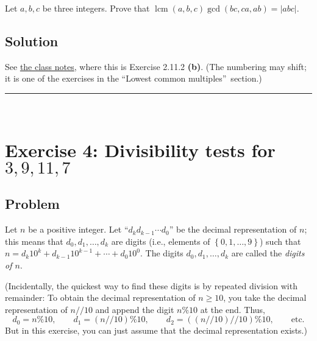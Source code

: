 \documentclass[paper=a4, fontsize=12pt]{scrartcl}%
\theoremstyle{plainsl}
\theoremstyle{definition}
\theoremstyle{remark}
\begin{document}
Let $a, b, c$ be three integers. Prove that $\operatorname{lcm}\left(  a, b, c
\right)  \gcd\left(  bc, ca, ab \right)  = \left|  abc \right|  $.

\subsection{Solution}

See \href{http://www-users.math.umn.edu/~dgrinber/19s/notes.pdf}{the class
notes}, where this is Exercise 2.11.2 \textbf{(b)}. (The numbering may shift;
it is one of the exercises in the \textquotedblleft Lowest common
multiples\textquotedblright\ section.)

\rule{\linewidth}{0.3pt} \\[0.4cm]

\section{Exercise 4: Divisibility tests for $3, 9, 11, 7$}

\subsection{Problem}

Let $n$ be a positive integer. Let ``$d_{k} d_{k-1} \cdots d_{0}$'' be the
decimal representation of $n$; this means that $d_{0}, d_{1}, \ldots, d_{k}$
are digits (i.e., elements of $\left\{  0, 1, \ldots, 9 \right\}  $) such that
$n = d_{k} 10^{k} + d_{k-1} 10^{k-1} + \cdots+ d_{0} 10^{0}$. The digits
$d_{0}, d_{1}, \ldots, d_{k}$ are called the \textit{digits of $n$}.

(Incidentally, the quickest way to find these digits is by repeated division
with remainder: To obtain the decimal representation of $n \geq10$, you take
the decimal representation of $n // 10$ and append the digit $n \% 10$ at the
end. Thus,
\[
d_{0} = n \% 10, \qquad d_{1} = \left(  n // 10 \right)  \% 10, \qquad d_{2} =
\left(  \left(  n // 10 \right)  // 10 \right)  \% 10, \qquad\text{etc.}
\]
But in this exercise, you can just assume that the decimal representation exists.)
\end{document}
